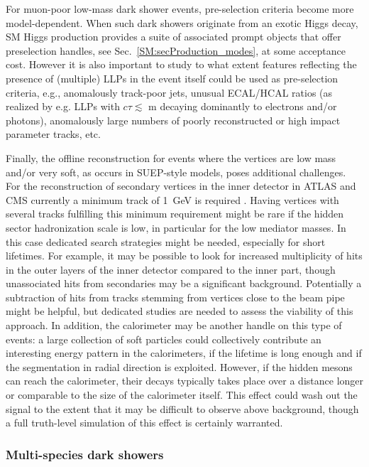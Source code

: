 For muon-poor low-mass dark shower events, pre-selection criteria become more model-dependent. When such dark showers originate from an exotic Higgs decay, SM Higgs production provides a suite of associated prompt objects that offer preselection handles, see Sec.~\ref{SM:secProduction_modes}, at some acceptance cost.   However it is also important to study to what extent features reflecting the presence of (multiple) LLPs in the event itself could be used as pre-selection criteria, e.g., anomalously track-poor jets, unusual ECAL/HCAL ratios (as realized by e.g. LLPs with $c\tau \lesssim$ m decaying dominantly to electrons and/or photons), anomalously large numbers of poorly reconstructed or high impact parameter tracks, etc.

Finally, the offline reconstruction for events where the vertices are low mass and/or very soft, as occurs in SUEP-style models, poses additional challenges. For the reconstruction of secondary vertices in the inner detector in ATLAS and CMS currently a minimum track \pt of 1~GeV is required \cite{Aaboud:2017iio,Chatrchyan:2012jua}. Having vertices with several tracks fulfilling this minimum \pt requirement might be rare if the hidden sector hadronization scale is low, in particular for the low mediator masses. In this case dedicated search strategies might be needed, especially for short lifetimes. For example, it may be possible to look for increased multiplicity of hits in the outer layers of the inner detector compared to the inner part, though unassociated hits from secondaries may be a significant background. Potentially a subtraction of hits from tracks stemming from vertices close to the beam pipe might be helpful, but dedicated studies are needed to assess the viability of this approach.
In addition, the calorimeter may be another handle on this type of events: a large collection of soft particles could collectively contribute an interesting energy pattern in the calorimeters, if the lifetime is long enough and if the segmentation in radial direction is exploited. However, if the hidden mesons can reach the calorimeter, their decays typically takes place over a distance longer or comparable to the size of the calorimeter itself. This effect could wash out the signal to the extent that it may be difficult to observe above background, though a full truth-level simulation of this effect is certainly warranted.
 




\subsubsection{Multi-species dark showers \label{sec:darkshowersemivisible}}

